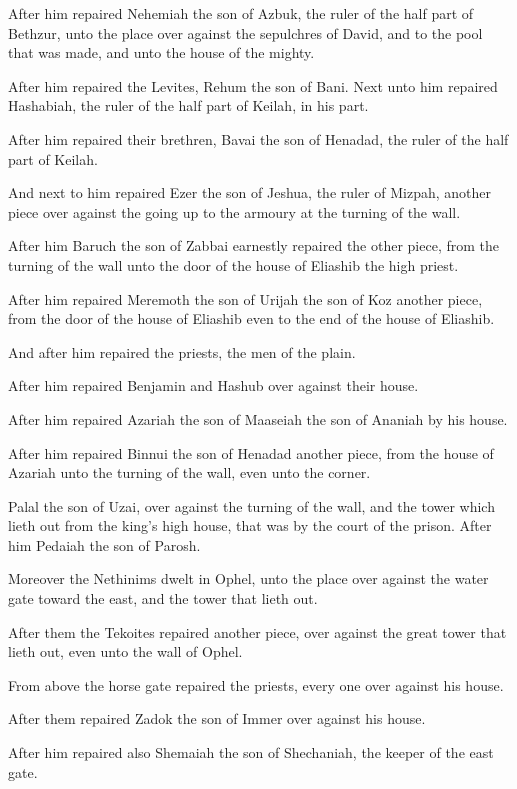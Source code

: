 \verse After him repaired Nehemiah the son of Azbuk, the ruler of the half part of Bethzur, unto the place over against the sepulchres of David, and to the pool that was made, and unto the house of the mighty.

\verse After him repaired the Levites, Rehum the son of Bani. Next unto him repaired Hashabiah, the ruler of the half part of Keilah, in his part.

\verse After him repaired their brethren, Bavai the son of Henadad, the ruler of the half part of Keilah.

\verse And next to him repaired Ezer the son of Jeshua, the ruler of Mizpah, another piece over against the going up to the armoury at the turning of the wall.

\verse After him Baruch the son of Zabbai earnestly repaired the other piece, from the turning of the wall unto the door of the house of Eliashib the high priest.

\verse After him repaired Meremoth the son of Urijah the son of Koz another piece, from the door of the house of Eliashib even to the end of the house of Eliashib.

\verse And after him repaired the priests, the men of the plain.

\verse After him repaired Benjamin and Hashub over against their house.

After him repaired Azariah the son of Maaseiah the son of Ananiah by his house.

\verse After him repaired Binnui the son of Henadad another piece, from the house of Azariah unto the turning of the wall, even unto the corner.

\verse Palal the son of Uzai, over against the turning of the wall, and the tower which lieth out from the king's high house, that was by the court of the prison. After him Pedaiah the son of Parosh.

\verse Moreover the Nethinims dwelt in Ophel, unto the place over against the water gate toward the east, and the tower that lieth out.

\verse After them the Tekoites repaired another piece, over against the great tower that lieth out, even unto the wall of Ophel.

\verse From above the horse gate repaired the priests, every one over against his house.

\verse After them repaired Zadok the son of Immer over against his house.

After him repaired also Shemaiah the son of Shechaniah, the keeper of the east gate.


